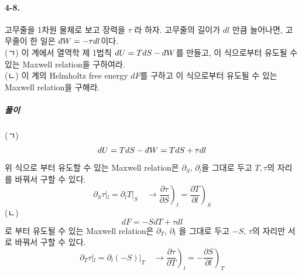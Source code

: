 \documentclass[a4paper,12pt]{report}
\newcommand{\Maxwell}[3][]{\left.\frac{\partial #2}{\partial #3} \right)_{#1} }
\newcommand{\dbar}{d\hspace*{-0.08em}\bar{}\hspace*{0.1em}}
\begin{document}
	 \paragraph{4-8. } 고무줄을 1차원 물체로 보고 장력을 $\tau$ 라 하자. 고무줄의 길이가 $dl$ 만큼 늘어나면, 고무줄이 한 일은 $\dbar W=-\tau dl$이다. \\
	 (ㄱ) 이 계에서 열역학 제 1법칙 $dU=TdS-\dbar W$를 만들고, 이 식으로부터 유도될 수 있는 Maxwell relation을 구하여라.\\
	 (ㄴ) 이 계의 Helmholtz free energy $dF$를 구하고 이 식으로부터 유도될 수 있는 Maxwell relation을 구해라.
	 \subparagraph{풀이} (ㄱ) 
	 $$dU=TdS-\dbar W=TdS+\tau dl$$
	 위 식으로 부터 유도할 수 있는 Maxwell relation은 $\partial _S, \, \partial_l$을 그대로 두고 $T, \tau$의 자리를 바꿔서 구할 수 있다.
	 $$\partial _S \tau|_l=\partial_l T|_S\quad \rightarrow \Maxwell[l]{\tau}{S}=\Maxwell[S]{T}{l}$$
	 (ㄴ)
	 $$dF=-SdT+\tau dl$$로 부터 유도될 수 있는 Maxwell relation은 $\partial_T,\,\partial_l$ 을 그대로 두고 $-S,\, \tau$의 자리만 서로 바꿔서 구할 수 있다.
	 $$\partial_T\tau|_l=\partial_l (-S)|_T\quad \rightarrow \Maxwell[l]{\tau}{T}=-\Maxwell[T]{S}{l}$$
\end{document}
